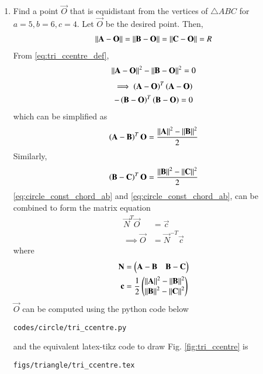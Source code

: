 \renewcommand{\theequation}{\theenumi}
\begin{enumerate}[label=\arabic*.,ref=\thesubsection.\theenumi]

\item Find a point $\vec{O}$ that is equidistant from the vertices of $\triangle ABC$ for $a = 5, b = 6, c = 4$.
%
\solution Let $\vec{O}$ be the desired point.  Then,
\begin{align}
\label{eq:tri_ccentre_def}
\left\lVert\mathbf{A}-\mathbf{O}\right\rVert = \left\lVert\mathbf{B}-\mathbf{O}\right\rVert = 
\left\lVert\mathbf{C}-\mathbf{O}\right\rVert = R
\end{align}
From \eqref{eq:tri_ccentre_def},
\begin{align}
\label{eq:circle_const_AB}
\left\lVert\mathbf{A}-\mathbf{O}\right\rVert^2 - \left\lVert\mathbf{B}-\mathbf{O}\right\rVert^2  = 0
\end{align}
\begin{multline}
\implies \left(\mathbf{A}-\mathbf{O}\right)^T\left(\mathbf{A}-\mathbf{O}\right) 
\\
- \left(\mathbf{B}-\mathbf{O}\right)^T\left(\mathbf{B}-\mathbf{O}\right) = 0
\end{multline}
%
which can be simplified as
\begin{align}
\label{eq:circle_const_chord_ab}
\left(\mathbf{A}-\mathbf{B}\right)^T\mathbf{O} =   \frac{\left\lVert\mathbf{A}\right\rVert^2- \left\lVert\mathbf{B}\right\rVert^2}{2}
\end{align}
Similarly,
\begin{align}
\label{eq:circle_const_chord_bc}
\left(\mathbf{B}-\mathbf{C}\right)^T\mathbf{O} =   \frac{\left\lVert\mathbf{B}\right\rVert^2- \left\lVert\mathbf{C}\right\rVert^2}{2}
\end{align}
%
\eqref{eq:circle_const_chord_ab} and \eqref{eq:circle_const_chord_ab}, can be combined to form the matrix equation 
%
\begin{align}
\label{eq:circle_const_chord_mat}
\vec{N}^T\vec{O} &= \vec{c}
\\
\implies \vec{O} &= \vec{N}^{-T} \vec{c}
\end{align}
%
where 
%
\begin{align}
\mathbf{N} &= \begin{pmatrix}\mathbf{A}-\mathbf{B} & \mathbf{B}-\mathbf{C}\end{pmatrix}
\\
\mathbf{c} &= \frac{1}{2}\begin{pmatrix}\left\lVert\mathbf{A}\right\rVert^2- \left\lVert\mathbf{B}\right\rVert^2 \\ \left\lVert\mathbf{B}\right\rVert^2- \left\lVert\mathbf{C}\right\rVert^2\end{pmatrix}
\end{align}
%
$\vec{O}$ can be computed using 
%
the python code below
%
\begin{lstlisting}
codes/circle/tri_ccentre.py
\end{lstlisting}
%
and the equivalent latex-tikz code to draw Fig. \ref{fig:tri_ccentre} is
%
\begin{lstlisting}
figs/triangle/tri_ccentre.tex
\end{lstlisting}
%
\begin{figure}[!ht]
	\begin{center}
		

\end{center}
\end{figure}
\end{enumerate}
